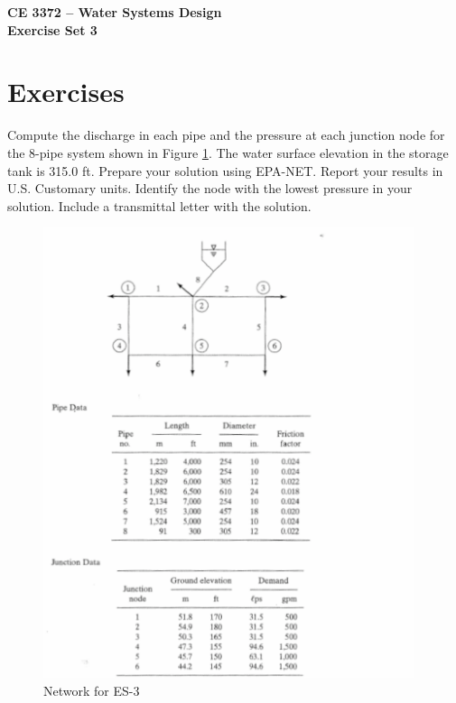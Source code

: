 \documentclass[12pt]{article}
\begin{document}
\begin{center}
{\textbf{{ CE 3372 -- Water Systems Design} \\ {Exercise Set 3}}}
\end{center}

\section*{\small{Exercises}} 
Compute the discharge in each pipe and the pressure at each junction node for the 8-pipe system shown in Figure \ref{fig:primary-network}.   The water surface elevation in the storage tank is 315.0 ft.   Prepare your solution using EPA-NET.   Report your results in U.S. Customary units.   Identify the node with the lowest pressure in your solution.   Include a transmittal letter with the solution.   
\begin{figure}[h!] %
   \centering
   \includegraphics[height=5.2in]{primary-network.pdf} 
   \caption{Network for ES-3}
   \label{fig:primary-network}
\end{figure}
\end{document}
